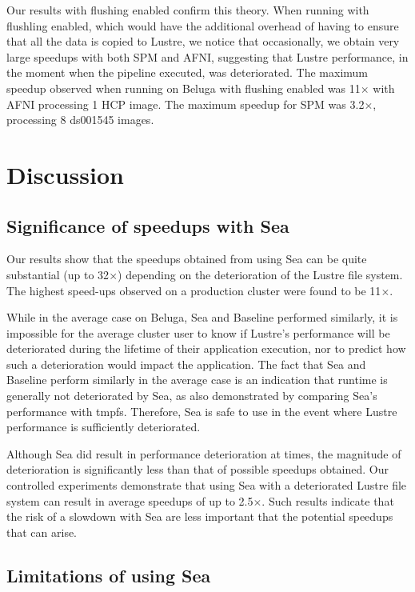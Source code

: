   Our results with flushing enabled confirm this theory. When running with flushling enabled,
  which would have the additional overhead of having to ensure that all the data is copied to
  Lustre, we notice that occasionally, we obtain very large speedups with both SPM 
  and AFNI, suggesting that Lustre performance, in the moment when the pipeline executed, was deteriorated.
  The maximum speedup observed when running on Beluga with flushing enabled was 11$\times$ with AFNI 
  processing 1 HCP image. The maximum speedup for SPM was 3.2$\times$, processing 8 ds001545 images.

    
    \section{Discussion}
    \subsection{Significance of speedups with Sea}

    Our results show that the speedups obtained from
    using Sea can be quite substantial (up to 32$\times$)
    depending on the deterioration of the Lustre
    file system. The highest speed-ups observed on a production cluster were found to be
    11$\times$.

    While in the average case on Beluga, Sea and Baseline performed similarly, it is
    impossible for the average cluster user to know if Lustre's performance will
    be deteriorated during the lifetime of their application execution,
    nor to predict how such a deterioration would impact the
    application. The fact that Sea and Baseline perform similarly in the
    average case is an indication that runtime is generally not deteriorated by Sea,
    as also demonstrated by comparing Sea's performance with tmpfs. Therefore, Sea
    is safe to use in the event where Lustre performance is sufficiently
    deteriorated.

    Although Sea did result in performance deterioration at times, the
    magnitude of deterioration is significantly less than that of possible
    speedups obtained. Our controlled experiments demonstrate that using
    Sea with a deteriorated Lustre file system can result in average
    speedups of up to 2.5$\times$. Such results indicate that the risk of a
    slowdown with Sea are less important that the potential speedups that
    can arise.

    \subsection{Limitations of using Sea}
    
